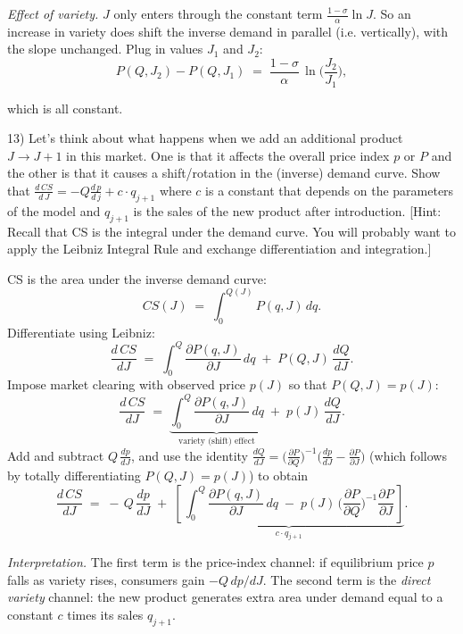 \documentclass{article}
\begin{document}
\textit{Effect of variety.} $J$ only enters through the constant term \(\tfrac{1-\sigma}{\alpha}\ln J\). So an increase in variety does shift the inverse demand in parallel (i.e. vertically), with the slope unchanged. Plug in values $J_1$ and $J_2$:
\[
P(Q,J_2)-P(Q,J_1)\;=\;\frac{1-\sigma}{\alpha}\,\ln\!\Big(\frac{J_2}{J_1}\Big),
\]

which is all constant.


\begin{tcolorbox}
13) Let's think about what happens when we add an additional product $J \rightarrow J+1$ in this market. One is that it affects the overall price index $p$ or $P$ and the other is that it causes a shift/rotation in the (inverse) demand curve. Show that $\frac{d\, CS}{d\, J} = -Q \frac{d\, p}{d\, j} +  c \cdot q_{j+1}$ where $c$ is a constant that depends on the parameters of the model and $q_{j+1}$ is the sales of the new product after introduction. [Hint: Recall that CS is the integral under the demand curve. You will probably want to apply the Leibniz Integral Rule and exchange differentiation and integration.]
\end{tcolorbox}

CS is the area under the inverse demand curve:
\[
CS(J)\;=\;\int_{0}^{Q(J)} P(q,J)\,dq.
\]
Differentiate using Leibniz:
\[
\frac{d\,CS}{dJ}
\;=\;\int_{0}^{Q}\frac{\partial P(q,J)}{\partial J}\,dq \;+\; P(Q,J)\,\frac{dQ}{dJ}.
\]
Impose market clearing with observed price $p(J)$ so that $P(Q,J)=p(J)$:
\[
\frac{d\,CS}{dJ}
\;=\;\underbrace{\int_{0}^{Q}\frac{\partial P(q,J)}{\partial J}\,dq}_{\text{variety (shift) effect}}
\;+\;p(J)\,\frac{dQ}{dJ}.
\]
Add and subtract $Q\,\frac{dp}{dJ}$, and use the identity
\(
\frac{dQ}{dJ}
= \Big(\frac{\partial P}{\partial Q}\Big)^{-1}
\!\Big(\frac{dp}{dJ}-\frac{\partial P}{\partial J}\Big)
\)
(which follows by totally differentiating $P(Q,J)=p(J)$) to obtain
\[
\frac{d\,CS}{dJ}
\;=\;
-\,Q\,\frac{dp}{dJ}
\;+\;
\underbrace{\left[\,
\int_{0}^{Q}\frac{\partial P(q,J)}{\partial J}\,dq
\;-\;
p(J)\,\Big(\frac{\partial P}{\partial Q}\Big)^{-1}\frac{\partial P}{\partial J}
\,\right]}_{\displaystyle c\cdot q_{j+1}}.
\]

\textit{Interpretation.} The first term is the price-index channel: if equilibrium price $p$ falls as
variety rises, consumers gain $-Q\,dp/dJ$. The second term is the \emph{direct variety} channel:
the new product generates extra area under demand equal to a constant $c$ times its sales $q_{j+1}$.

\vspace{5mm}
\end{document}
